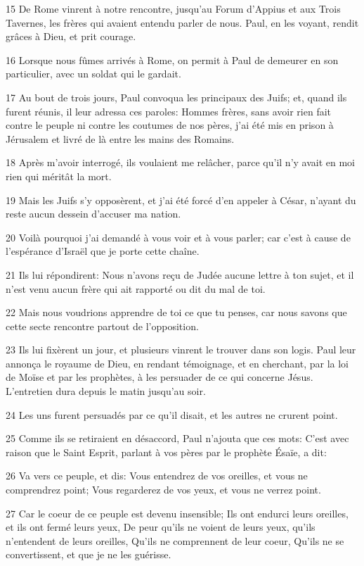 \par 15 De Rome vinrent à notre rencontre, jusqu'au Forum d'Appius et aux Trois Tavernes, les frères qui avaient entendu parler de nous. Paul, en les voyant, rendit grâces à Dieu, et prit courage.
\par 16 Lorsque nous fûmes arrivés à Rome, on permit à Paul de demeurer en son particulier, avec un soldat qui le gardait.
\par 17 Au bout de trois jours, Paul convoqua les principaux des Juifs; et, quand ils furent réunis, il leur adressa ces paroles: Hommes frères, sans avoir rien fait contre le peuple ni contre les coutumes de nos pères, j'ai été mis en prison à Jérusalem et livré de là entre les mains des Romains.
\par 18 Après m'avoir interrogé, ils voulaient me relâcher, parce qu'il n'y avait en moi rien qui méritât la mort.
\par 19 Mais les Juifs s'y opposèrent, et j'ai été forcé d'en appeler à César, n'ayant du reste aucun dessein d'accuser ma nation.
\par 20 Voilà pourquoi j'ai demandé à vous voir et à vous parler; car c'est à cause de l'espérance d'Israël que je porte cette chaîne.
\par 21 Ils lui répondirent: Nous n'avons reçu de Judée aucune lettre à ton sujet, et il n'est venu aucun frère qui ait rapporté ou dit du mal de toi.
\par 22 Mais nous voudrions apprendre de toi ce que tu penses, car nous savons que cette secte rencontre partout de l'opposition.
\par 23 Ils lui fixèrent un jour, et plusieurs vinrent le trouver dans son logis. Paul leur annonça le royaume de Dieu, en rendant témoignage, et en cherchant, par la loi de Moïse et par les prophètes, à les persuader de ce qui concerne Jésus. L'entretien dura depuis le matin jusqu'au soir.
\par 24 Les uns furent persuadés par ce qu'il disait, et les autres ne crurent point.
\par 25 Comme ils se retiraient en désaccord, Paul n'ajouta que ces mots: C'est avec raison que le Saint Esprit, parlant à vos pères par le prophète Ésaïe, a dit:
\par 26 Va vers ce peuple, et dis: Vous entendrez de vos oreilles, et vous ne comprendrez point; Vous regarderez de vos yeux, et vous ne verrez point.
\par 27 Car le coeur de ce peuple est devenu insensible; Ils ont endurci leurs oreilles, et ils ont fermé leurs yeux, De peur qu'ils ne voient de leurs yeux, qu'ils n'entendent de leurs oreilles, Qu'ils ne comprennent de leur coeur, Qu'ils ne se convertissent, et que je ne les guérisse.
